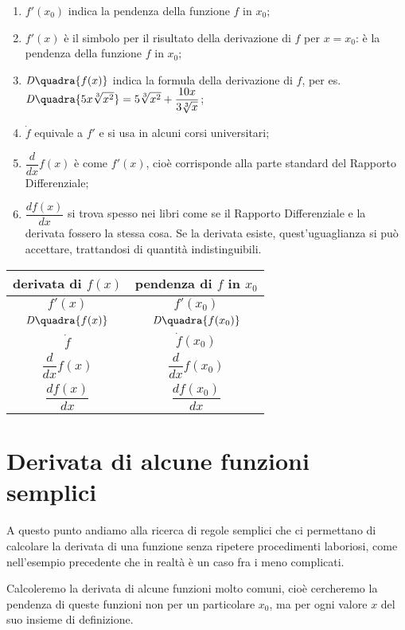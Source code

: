\begin{enumerate}[noitemsep]
 \item \(f'(x_0)\) indica la pendenza della funzione \(f\) in \(x_0\);
 \item \(f'(x)\) è il simbolo per il risultato della derivazione di \(f\) 
 per \(x= x_0\): è la pendenza della funzione \(f\) in \(x_0\);
 \item \(\mathit{D}\quadra{f(x)}\) indica la formula della derivazione di 
\(f\),  per es. \(\mathit{D}\quadra{5x\sqrt[3]{x^2}}=5\sqrt[3]{x^2}+\dfrac{10x}
 {3\sqrt[3]{x}}\);
 \item \(\dot{f}\) equivale a \(f'\) e si usa in alcuni corsi universitari;
 \item \(\dfrac{d}{dx}f(x)\) è come \(f'(x)\), cioè corrisponde alla parte 
standard del Rapporto Differenziale;
 \item \(\dfrac{df(x)}{dx}\) si trova spesso nei libri come se il Rapporto
 Differenziale e la derivata fossero la stessa cosa. Se la derivata 
esiste, quest'uguaglianza si può accettare, trattandosi di quantità 
indistinguibili. 
\end{enumerate}

\begin{center}
\begin{tabular}{cc}
derivata di \(f(x)\) & pendenza di \(f\) in \(x_0\) \\
\midrule
\(f'(x)\) &  \(f'(x_0)\)\\[.3em]
\(\mathit{D}\quadra{f(x)}\) & \(\mathit{D}\quadra{f(x_0)}\)\\[.3em]
\(\dot{f}\) & \(\dot{f}(x_0)\)\\[.3em]
\(\dfrac{d}{dx}f(x)\) & \(\dfrac{d}{dx}f(x_0)\) \\[1em]
\(\dfrac{df(x)}{dx}\) & \(\dfrac{df(x_0)}{dx}\) \\[.5em]
\bottomrule
\end{tabular}
\end{center}

\section{Derivata di alcune funzioni semplici}
\label{sec:differenziazione_derivatafsemplici}
A questo punto andiamo alla ricerca di regole semplici che ci permettano 
di calcolare la derivata di una funzione senza ripetere procedimenti 
laboriosi, come nell'esempio precedente che in realtà è un caso fra i 
meno complicati.

Calcoleremo la derivata di alcune funzioni molto comuni, cioè cercheremo 
la pendenza di queste funzioni non per un particolare \(x_0\), ma per ogni 
valore \(x\) del suo insieme di definizione.


